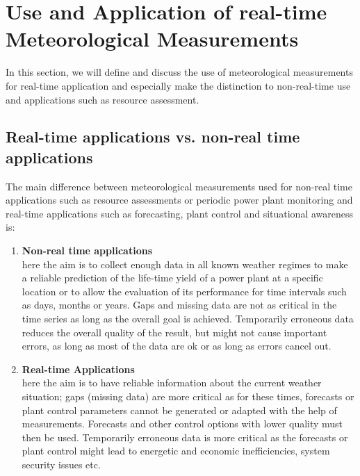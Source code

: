 {\color{green}{Commend COM (2021-06-30): We need to incorporate the power measurements here also --- this is an outstanding task! }}

\section{Use and Application of real-time Meteorological Measurements }
{\color{magenta}{Contributing author: JY, JZ, COM}}

In this section, we will define and discuss the use of meteorological measurements for real-time application and especially make the distinction to non-real-time use and applications such as resource assessment. 


\subsection{Real-time applications vs. non-real time applications}
The main difference between meteorological measurements used for non-real time applications such as resource assessments or periodic power plant monitoring and real-time applications such as forecasting, plant control and situational awareness is: 
\begin{enumerate}
    \item \textbf{Non-real time applications}\\
    here the aim is to collect enough data in all known weather regimes to make a reliable prediction of the life-time yield of a power plant at a specific location or to allow the evaluation of its performance for time intervals such as days, months or years. Gaps and missing data are not as critical in the time series as long as the overall goal is achieved. Temporarily erroneous data reduces the overall quality of the result, but might not cause important errors, as long as most of the data are ok or as long as errors cancel out.
    \item \textbf{Real-time Applications}\\
    here the aim is to have reliable information about the current weather situation; gaps (missing data) are more critical as for these times, forecasts or plant control parameters cannot be generated or adapted with the help of measurements. Forecasts and other control options with lower quality must then be used. Temporarily erroneous data is more critical as the forecasts or plant control might lead to energetic and economic inefficiencies, system security issues etc.
\end{enumerate}

